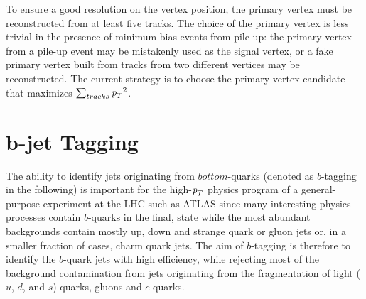 \begin{itemize}
To ensure a good resolution on the vertex position, the primary vertex
must be reconstructed from at least five tracks. The choice of the primary vertex is less trivial in the presence of minimum-bias events from pile-up:
the primary vertex from a pile-up event may be mistakenly used as the signal vertex, or a fake primary vertex built from tracks from two different vertices may be reconstructed. The current strategy is to choose the primary vertex candidate that maximizes $\sum_{tracks} {\emph{p}_{T}}^2$.

\section{ ${\bm b}$-jet Tagging}\label{sec:btagging}



The ability to identify jets originating from $bottom$-quarks (denoted as $b$-tagging in the following) is important for the high-${\emph{p}_{T}}$ physics program of a general-purpose experiment at the LHC such as ATLAS since many interesting physics processes contain $b$-quarks in the final, state while the most abundant backgrounds contain mostly up, down and strange quark or gluon jets or, in a smaller fraction of cases, charm quark jets. The aim of $b$-tagging is therefore to identify the $b$-quark jets with high efficiency, while rejecting most of the background contamination from jets originating from the fragmentation of light ($u$, $d$, and $s$) quarks, gluons and $c$-quarks.


\end{itemize}
